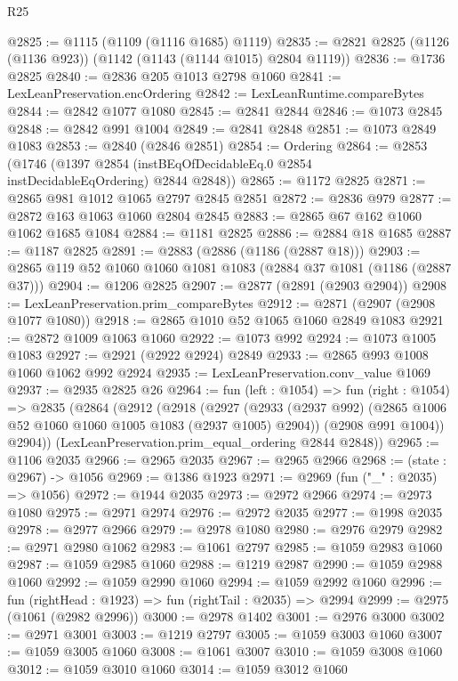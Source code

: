 \begin{lexlean}{R25}
\begin{coremodule}
{{{{{{{{{{{{{{{{{{{{{{{{{{{{{{{{{{{{{{{{{{{{{{{{{{{{{@2825 := @1115 (@1109 (@1116 @1685) @1119)
@2835 := @2821 @2825 (@1126 (@1136 @923)) (@1142 (@1143 (@1144 @1015) @2804 @1119))
@2836 := @1736 @2825
@2840 := @2836 @205 @1013 @2798 @1060
@2841 := LexLeanPreservation.encOrdering
@2842 := LexLeanRuntime.compareBytes
@2844 := @2842 @1077 @1080
@2845 := @2841 @2844
@2846 := @1073 @2845
@2848 := @2842 @991 @1004
@2849 := @2841 @2848
@2851 := @1073 @2849 @1083
@2853 := @2840 (@2846 @2851)
@2854 := Ordering
@2864 := @2853
    (@1746 (@1397 @2854 (instBEqOfDecidableEq.{0} @2854 instDecidableEqOrdering) @2844 @2848))
@2865 := @1172 @2825
@2871 := @2865 @981 @1012 @1065 @2797 @2845 @2851
@2872 := @2836 @979
@2877 := @2872 @163 @1063 @1060 @2804 @2845
@2883 := @2865 @67 @162 @1060 @1062 @1685 @1084
@2884 := @1181 @2825
@2886 := @2884 @18 @1685
@2887 := @1187 @2825
@2891 := @2883 (@2886 (@1186 (@2887 @18)))
@2903 := @2865 @119 @52 @1060 @1060 @1081 @1083 (@2884 @37 @1081 (@1186 (@2887 @37)))
@2904 := @1206 @2825
@2907 := @2877 (@2891 (@2903 @2904))
@2908 := LexLeanPreservation.prim_compareBytes
@2912 := @2871 (@2907 (@2908 @1077 @1080))
@2918 := @2865 @1010 @52 @1065 @1060 @2849 @1083
@2921 := @2872 @1009 @1063 @1060
@2922 := @1073 @992
@2924 := @1073 @1005 @1083
@2927 := @2921 (@2922 @2924) @2849
@2933 := @2865 @993 @1008 @1060 @1062 @992 @2924
@2935 := LexLeanPreservation.conv_value @1069
@2937 := @2935 @2825 @26
@2964 := fun (left : @1054) =>
  fun (right : @1054) =>
  @2835
    (@2864
      (@2912
        (@2918
          (@2927
            (@2933 (@2937 @992) (@2865 @1006 @52 @1060 @1060 @1005 @1083 (@2937 @1005) @2904))
            (@2908 @991 @1004))
          @2904))
      (LexLeanPreservation.prim_equal_ordering @2844 @2848))
@2965 := @1106 @2035
@2966 := @2965 @2035
@2967 := @2965 @2966
@2968 := (state : @2967) -> @1056
@2969 := @1386 @1923
@2971 := @2969 (fun ("_" : @2035) => @1056)
@2972 := @1944 @2035
@2973 := @2972 @2966
@2974 := @2973 @1080
@2975 := @2971 @2974
@2976 := @2972 @2035
@2977 := @1998 @2035
@2978 := @2977 @2966
@2979 := @2978 @1080
@2980 := @2976 @2979
@2982 := @2971 @2980 @1062
@2983 := @1061 @2797
@2985 := @1059 @2983 @1060
@2987 := @1059 @2985 @1060
@2988 := @1219 @2987
@2990 := @1059 @2988 @1060
@2992 := @1059 @2990 @1060
@2994 := @1059 @2992 @1060
@2996 := fun (rightHead : @1923) => fun (rightTail : @2035) => @2994
@2999 := @2975 (@1061 (@2982 @2996))
@3000 := @2978 @1402
@3001 := @2976 @3000
@3002 := @2971 @3001
@3003 := @1219 @2797
@3005 := @1059 @3003 @1060
@3007 := @1059 @3005 @1060
@3008 := @1061 @3007
@3010 := @1059 @3008 @1060
@3012 := @1059 @3010 @1060
@3014 := @1059 @3012 @1060
}}}}}}}}}}}}}}}}}}}}}}}}}}}}}}}}}}}}}}}}}}}}}}}}}}}}}
\end{coremodule}
\end{lexlean}

